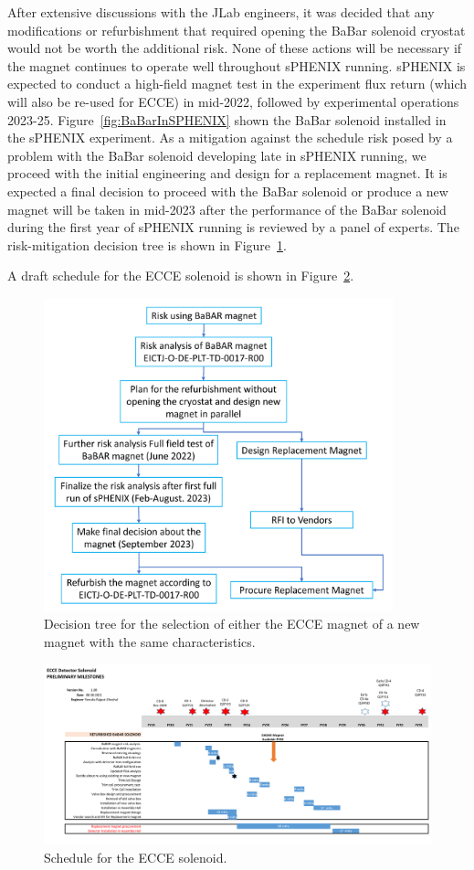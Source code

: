 After extensive discussions with the JLab engineers, it was decided that any modifications or refurbishment that required opening the BaBar solenoid cryostat would not be worth the additional risk. None of these actions will be necessary if the magnet continues to operate well throughout sPHENIX running. sPHENIX is expected to conduct a high-field magnet test in the experiment flux return (which will also be re-used for ECCE) in mid-2022, followed by experimental operations 2023-25. Figure~\ref{fig:BaBarInSPHENIX} shown the BaBar solenoid installed in the sPHENIX experiment. As a mitigation against the schedule risk posed by a problem with the BaBar solenoid developing late in sPHENIX running, we proceed with the initial engineering and design for a replacement magnet. It is expected a final decision to proceed with the BaBar solenoid or produce a new magnet will be taken in mid-2023 after the performance of the BaBar solenoid during the first year of sPHENIX running is reviewed by a panel of experts.  The risk-mitigation decision tree is shown in Figure~\ref{fig:risk_tree}. 

A draft schedule for the ECCE solenoid is shown in Figure~\ref{fig:magnet_schedule}. 

\begin{figure}[h!tbp]
    \centering
    \includegraphics[width=0.9\textwidth]{figs/flowchart_Page_1.png}
    \caption{Decision tree for the selection of either the ECCE magnet of a new magnet with the same characteristics.}
    \label{fig:risk_tree}
\end{figure}

\begin{figure}
    \centering
    \includegraphics[width=1.0\textwidth]{figs/ECCE Detector Solenoid_Babar reuse_v5.png}
    \caption{Schedule for the ECCE solenoid.}
    \label{fig:magnet_schedule}
\end{figure}